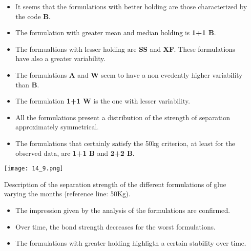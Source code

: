 \begin{frame}
\begin{itemize}
 \item It seems that the formulations with better holding are those characterized by the code \textbf{B}.
 \item The formulation with greater mean and median holding is \textbf{1+1 B}.
 \item The formualtions with lesser holding are \textbf{SS} and \textbf{XF}. These formulations have also a greater variability.
 \item The formulations \textbf{A} and \textbf{W} seem to have a non evedently higher variability than  \textbf{B}.
 \item The formulation \textbf{1+1 W} is the one with lesser variability.
 \item All the formulations present a distribution of the strength of separation approximately symmetrical.  
 \item The formulations that certainly satisfy the 50kg criterion, at least for the observed data, are \textbf{1+1 B} and  \textbf{2+2 B}. 
 \end{itemize}

\end{frame}

\begin{frame}
	\vspace{.3cm}
	\begin{center}
		\texttt{[image: 14\_9.png]}
	\end{center}
    \begin{center}
\begin{footnotesize}
 Description of the separation strength of the different formulations of glue varying the months (reference line: 50Kg). 
\end{footnotesize}
  \end{center}
\end{frame}

\begin{frame}
\begin{itemize}
 \item The impression given by the analysis of the formulations are confirmed.
 \item Over time, the bond strength decreases for the worst formulations. 
 \item The formulations with greater holding highligth a certain stability over time.
 \end{itemize}
\end{frame}



